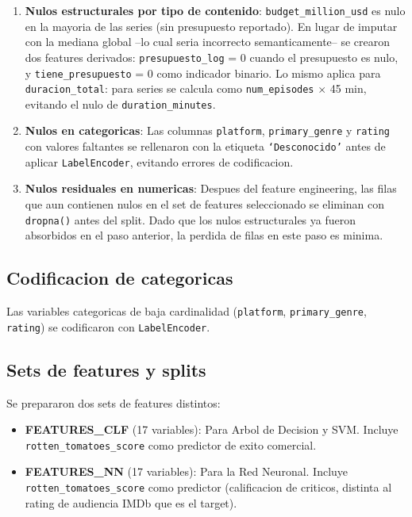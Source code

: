 \documentclass[12pt, a4paper]{article}
\begin{document}
\begin{enumerate}
\item \textbf{Nulos estructurales por tipo de contenido}: \texttt{budget\_million\_usd} es nulo en la mayoria de las series (sin presupuesto reportado). En lugar de imputar con la mediana global --lo cual seria incorrecto semanticamente-- se crearon dos features derivados: \texttt{presupuesto\_log} = 0 cuando el presupuesto es nulo, y \texttt{tiene\_presupuesto} = 0 como indicador binario. Lo mismo aplica para \texttt{duracion\_total}: para series se calcula como \texttt{num\_episodes} $\times$ 45 min, evitando el nulo de \texttt{duration\_minutes}.

\item \textbf{Nulos en categoricas}: Las columnas \texttt{platform}, \texttt{primary\_genre} y \texttt{rating} con valores faltantes se rellenaron con la etiqueta \texttt{`Desconocido'} antes de aplicar \texttt{LabelEncoder}, evitando errores de codificacion.

\item \textbf{Nulos residuales en numericas}: Despues del feature engineering, las filas que aun contienen nulos en el set de features seleccionado se eliminan con \texttt{dropna()} antes del split. Dado que los nulos estructurales ya fueron absorbidos en el paso anterior, la perdida de filas en este paso es minima.
\end{enumerate}

\subsection{Codificacion de categoricas}

Las variables categoricas de baja cardinalidad (\texttt{platform}, \texttt{primary\_genre}, \texttt{rating}) se codificaron con \texttt{LabelEncoder}.

\subsection{Sets de features y splits}

Se prepararon dos sets de features distintos:

\begin{itemize}
\item \textbf{FEATURES\_CLF} (17 variables): Para Arbol de Decision y SVM. Incluye \texttt{rotten\_tomatoes\_score} como predictor de exito comercial.
\item \textbf{FEATURES\_NN} (17 variables): Para la Red Neuronal. Incluye \texttt{rotten\_tomatoes\_score} como predictor (calificacion de criticos, distinta al rating de audiencia IMDb que es el target).
\end{itemize}
\end{document}
